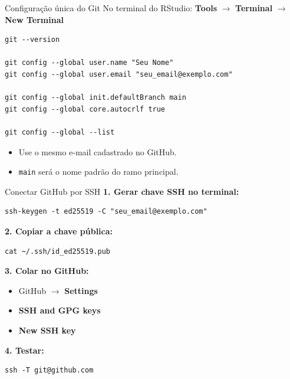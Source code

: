\documentclass[10pt,aspectratio=169]{beamer}
\begin{document}
\begin{frame}[fragile]{Configuração única do Git}
No terminal do RStudio: \textbf{Tools} $\rightarrow$ \textbf{Terminal} $\rightarrow$ \textbf{New Terminal}

\vspace{0.25cm}
\begin{lstlisting}
git --version

git config --global user.name "Seu Nome"
git config --global user.email "seu_email@exemplo.com"

git config --global init.defaultBranch main
git config --global core.autocrlf true

git config --global --list
\end{lstlisting}

\vspace{0.15cm}
\begin{itemize}
  \item Use o mesmo e-mail cadastrado no GitHub.
  \item \texttt{main} será o nome padrão do ramo principal.
\end{itemize}
\end{frame}

\begin{frame}[fragile]{Conectar GitHub por SSH}
\textbf{1. Gerar chave SSH no terminal:}

\begin{lstlisting}
ssh-keygen -t ed25519 -C "seu_email@exemplo.com"
\end{lstlisting}

\textbf{2. Copiar a chave pública:}

\begin{lstlisting}
cat ~/.ssh/id_ed25519.pub
\end{lstlisting}

\textbf{3. Colar no GitHub:}

\begin{itemize}
  \item GitHub $\rightarrow$ \textbf{Settings}
  \item \textbf{SSH and GPG keys}
  \item \textbf{New SSH key}
\end{itemize}

\textbf{4. Testar:}

\begin{lstlisting}
ssh -T git@github.com
\end{lstlisting}
\end{frame}
\end{document}
